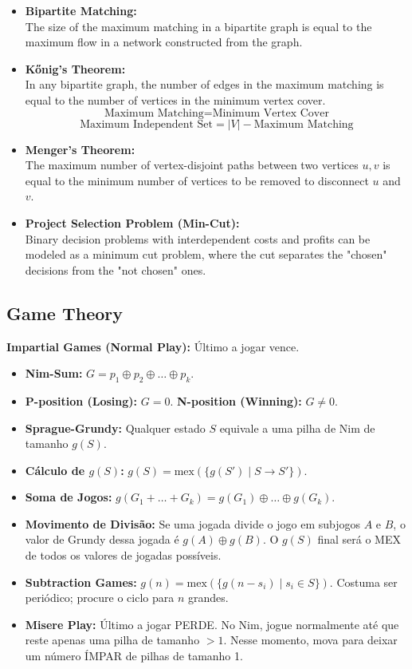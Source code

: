 \begin{itemize}
    \item \textbf{Bipartite Matching:}\\
    The size of the maximum matching in a bipartite graph is equal to the maximum flow in a network constructed from the graph.
    
    \item \textbf{Kőnig's Theorem:}\\
    In any bipartite graph, the number of edges in the maximum matching is equal to the number of vertices in the minimum vertex cover.
    $$ \text{Maximum Matching} = \text{Minimum Vertex Cover} $$
    $$ \text{Maximum Independent Set} = |V| - \text{Maximum Matching} $$

    \item \textbf{Menger's Theorem:}\\
    The maximum number of vertex-disjoint paths between two vertices $u, v$ is equal to the minimum number of vertices to be removed to disconnect $u$ and $v$.
        
    \item \textbf{Project Selection Problem (Min-Cut):}\\
    Binary decision problems with interdependent costs and profits can be modeled as a minimum cut problem, where the cut separates the "chosen" decisions from the "not chosen" ones.
\end{itemize}

\subsection{Game Theory}

\textbf{Impartial Games (Normal Play):} Último a jogar vence.
\begin{itemize}[leftmargin=*, nosep]
    \item \textbf{Nim-Sum:} $G = p_1 \oplus p_2 \oplus \dots \oplus p_k$. 
    \item \textbf{P-position (Losing):} $G = 0$. \textbf{N-position (Winning):} $G \neq 0$.
    \item \textbf{Sprague-Grundy:} Qualquer estado $S$ equivale a uma pilha de Nim de tamanho $g(S)$.
    \item \textbf{Cálculo de $g(S)$:} $g(S) = \text{mex}(\{g(S') \mid S \to S'\})$.
    \item \textbf{Soma de Jogos:} $g(G_1 + \dots + G_k) = g(G_1) \oplus \dots \oplus g(G_k)$.
    \item \textbf{Movimento de Divisão:} Se uma jogada divide o jogo em subjogos $A$ e $B$, o valor de Grundy dessa jogada é $g(A) \oplus g(B)$. O $g(S)$ final será o MEX de todos os valores de jogadas possíveis.
    \item \textbf{Subtraction Games:} $g(n) = \text{mex}(\{g(n-s_i) \mid s_i \in S\})$. Costuma ser periódico; procure o ciclo para $n$ grandes.
    \item \textbf{Misere Play:} Último a jogar PERDE. No Nim, jogue normalmente até que reste apenas uma pilha de tamanho $>1$. Nesse momento, mova para deixar um número ÍMPAR de pilhas de tamanho 1.
\end{itemize}

